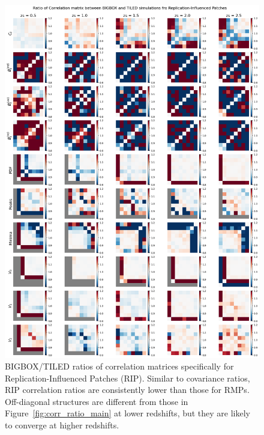 \begin{figure}[p]
    \centering
    \includegraphics[width=\textwidth]{figures/results/corr_ratio_RIP.png}
    \caption[Correlation Ratios for RIP]{BIGBOX/TILED ratios of correlation matrices specifically for Replication-Influenced Patches (RIP). Similar to covariance ratios, RIP correlation ratios are consistently lower than those for RMPs. Off-diagonal structures are different from those in Figure~\ref{fig:corr_ratio_main} at lower redshifts, but they are likely to converge at higher redshifts.}
    \label{fig:boxreplication_corr_RIP}
\end{figure}

\clearpage

